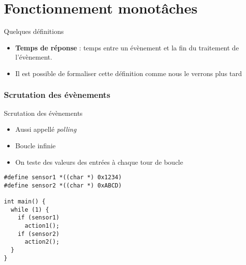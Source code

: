 %                                                                                                               
%
%

\part{Fonctionnement monotâches}

\begin{frame}
  \partpage
\end{frame}

\begin{frame}
  \tableofcontents[currentpart]
\end{frame}

\begin{frame}{Quelques définitions}
  \begin{itemize}
  \item \textbf{Temps de réponse} : temps entre un évènement et la fin
    du traitement de l'évènement.
  \item Il est  possible de formaliser cette définition  comme nous le
    verrons plus tard
  \end{itemize} 
\end{frame}

\section{Scrutation des évènements}
\begin{frame}[fragile]{Scrutation des évènements}
  \begin{itemize} 
  \item Aussi appellé \emph{polling}
  \item Boucle infinie 
  \item On teste des valeurs des entrées à chaque tour de boucle
  \end{itemize} 
  \begin{lstlisting} 
#define sensor1 *((char *) 0x1234)
#define sensor2 *((char *) 0xABCD)

int main() {
  while (1) {
    if (sensor1)
      action1();
    if (sensor2)
      action2();
  }
}
  \end{lstlisting} 
\end{frame}

